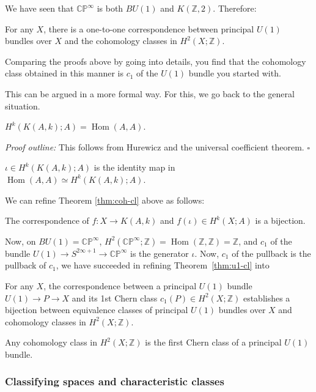 \documentclass[12pt]{article}
\numberwithin{equation}{section}
\theoremstyle{remark}
\renewenvironment{proof}{\noindent\textsl{Proof outline:}}{\hfill$\square$}
\def\bZ{\mathbb{Z}}
\def\CP{\mathbb{CP}}
\def\Hom{\mathop{\mathrm{Hom}}}
\begin{document}
We have seen that $\CP^\infty$ is both $BU(1)$ and $K(\bZ,2)$.
Therefore:
\begin{theorem}
\label{thm:u1-cl}
For any $X$, there is a one-to-one correspondence between principal $U(1)$ bundles over $X$
and the cohomology classes in $H^2(X;\bZ)$.
\end{theorem}
Comparing the proofs above by going into details, 
you find that the cohomology class obtained in this manner is 
$c_1$ of the $U(1)$ bundle you started with.

This can be argued in a more formal way.
For this, we go back to the general situation.
\begin{proposition}
$H^k(K(A,k);A)=\Hom(A,A)$.
\end{proposition}
\begin{proof}
This follows from Hurewicz and the universal coefficient theorem.
\end{proof}

\begin{definition}
$\iota \in H^k(K(A,k);A)$ is the identity map in $\Hom(A,A)\simeq H^k(K(A,k);A)$.
\end{definition}

We can refine Theorem \ref{thm:coh-cl} above as follows:
\begin{theorem}
The correspondence of $f: X\to K(A,k)$  and $f(\iota)\in H^k(X;A)$ is a bijection.
\end{theorem}

Now, on $BU(1)=\CP^\infty$, $H^2(\CP^\infty;\bZ)=\Hom(\bZ,\bZ)=\bZ$,
and $c_1$ of the bundle $U(1)\to S^{2\infty+1}\to \CP^\infty$ is the generator $\iota$.
Now, $c_1$ of the pullback is the pullback of $c_1$, we have succeeded in refining Theorem~\ref{thm:u1-cl} into
\begin{theorem}
For any $X$,
the correspondence between  a principal $U(1)$ bundle $U(1)\to P\to X$
and its 1st Chern class $c_1(P)\in H^2(X;\bZ)$ 
establishes a bijection between equivalence classes of principal $U(1)$ bundles over $X$
and cohomology classes in $H^2(X;\bZ)$.
\end{theorem}

\begin{corollary}
Any cohomology class  in $H^2(X;\bZ)$ is the first Chern class of a principal $U(1)$ bundle.
\end{corollary}

\subsubsection{Classifying spaces and characteristic classes}
\end{document}
